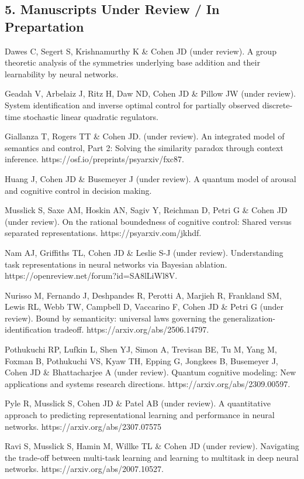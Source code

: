 \documentclass[10 pt]{article}
\begin{document}
\subsection*{5. Manuscripts Under Review / In Prepartation} \label{secPUBLICATIONS5}

Dawes C, Segert S, Krishnamurthy K \& Cohen JD (under review). A group theoretic analysis of the symmetries underlying base addition and their learnability by neural networks.

Geadah V, Arbelaiz J, Ritz H, Daw ND, Cohen JD \& Pillow JW (under review). System identification and inverse optimal control for partially observed discrete-time stochastic linear quadratic regulators.

Giallanza T, Rogers TT \& Cohen JD. (under review). An integrated model of semantics and control, Part 2: Solving the similarity paradox through context inference. https://osf.io/preprints/psyarxiv/fxc87.

Huang J, Cohen JD \& Busemeyer J (under review). A quantum model of arousal and cognitive control in decision making.

Musslick S, Saxe AM, Hoskin AN, Sagiv Y, Reichman D, Petri G \& Cohen JD (under review). On the rational boundedness of cognitive control: Shared versus separated representations. https://psyarxiv.com/jkhdf.

Nam AJ, Griffiths TL, Cohen JD \& Leslie S-J (under review). Understanding task representations in neural networks via Bayesian ablation. https://openreview.net/forum?id=SA8lLiWl8V.

Nurisso M, Fernando J, Deshpandes R, Perotti A, Marjieh R, Frankland SM, Lewis RL, Webb TW, Campbell D, Vaccarino F, Cohen JD \& Petri G (under review). Bound by semanticity: universal laws governing the generalization-identification tradeoff. https://arxiv.org/abs/2506.14797.

Pothukuchi RP, Lufkin L, Shen YJ, Simon A, Trevisan BE, Tu M, Yang M, Foxman B, Pothukuchi VS, Kyaw TH, Epping G, Jongkees B, Busemeyer J, Cohen JD \& Bhattacharjee A (under review). Quantum cognitive modeling: New applications and systems research directions. https://arxiv.org/abs/2309.00597.

Pyle R, Musslick S, Cohen JD \& Patel AB (under review). A quantitative approach to predicting representational learning and performance in neural networks. https://arxiv.org/abs/2307.07575

Ravi S, Musslick S, Hamin M, Willke TL \& Cohen JD (under review). Navigating the trade-off between multi-task learning and learning to multitask in deep neural networks. https://arxiv.org/abs/2007.10527.
\end{document}
